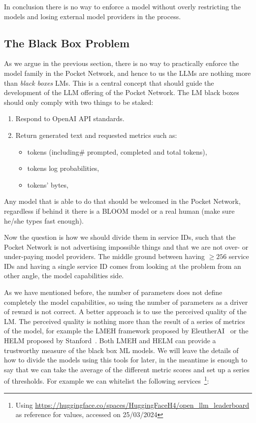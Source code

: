 In conclusion there is no way to enforce a model without overly restricting the models and losing external model providers in the process.

\newpage
\subsection{The Black Box Problem}
As we argue in the previous section, there is no way to practically enforce the model family in the Pocket Network, and hence to us the \glspl{LLM} are nothing more than \emph{black boxes} \glspl{LM}. This is a central concept that should guide the development of the \gls{LLM} offering of the Pocket Network.
The \gls{LM} black boxes should only comply with two things to be staked:
\begin{enumerate}
    \item Respond to OpenAI API standards.
    \item Return generated text and requested metrics such as:
    \begin{itemize}
        \item tokens (including\# prompted, completed and total tokens),
        \item tokens log probabilities,
        \item tokens' bytes,
    \end{itemize}
\end{enumerate}
Any model that is able to do that should be welcomed in the Pocket Network, regardless if behind it there is a BLOOM model or a real human (make sure he/she types fast enough).

Now the question is how we should divide them in service IDs, such that the Pocket Network is not advertising impossible things and that we are not over- or under-paying model providers. The middle ground between having $\ge 256$ service IDs and having a single service ID comes from looking at the problem from an other angle, the model capabilities side.

As we have mentioned before, the number of parameters does not define completely the model capabilities, so using the number of parameters as a driver of reward is not correct. A better approach is to use the perceived quality of the \gls{LM}. The perceived quality is nothing more than the result of a series of metrics of the model, for example the \gls{LMEH} framework proposed by EleutherAI~\cite{eval-harness} or the \gls{HELM} proposed by Stanford~\cite{liang_holistic_2023}. Both \gls{LMEH} and \gls{HELM} can provide a trustworthy measure of the black box \gls{ML} models. We will leave the details of how to divide the models using this tools for later, in the meantime is enough to say that we can take the average of the different metric scores and set up a series of thresholds. For example we can whitelist the following services~\footnote{Using \url{https://huggingface.co/spaces/HuggingFaceH4/open_llm_leaderboard} as reference for values, accessed on 25/03/2024}:

